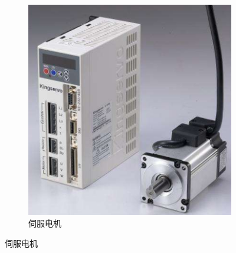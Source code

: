 \documentclass[UTF8]{article} %
\begin{document}
\begin{figure}[H]
\begin{subfigure}[b]{0.22\textwidth}
          \includegraphics[width=\textwidth]{dj2.png}
          \caption{伺服电机}
  \end{subfigure}
\end{figure}
\end{document}
